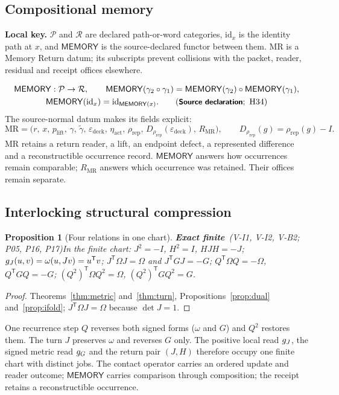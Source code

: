 \documentclass[11pt,a4paper]{article}
\newcommand{\tp}{^{\mathsf T}}
\newcommand{\MEM}{\mathsf{MEMORY}}
\newcommand{\id}{\mathrm{id}}
\newcommand{\st}[1]{\textsf{\small\textbf{#1}}}
\newcommand{\Sfin}{\st{Exact finite}}\newcommand{\Sder}{\st{Exact derived}}
\newcommand{\Ssrc}{\st{Source declaration}}\newcommand{\Sint}{\st{Interface}}
\newcommand{\lkey}[1]{\par\noindent\textbf{Local key.} #1\par\smallskip}
\theoremstyle{plain}
\newtheorem{prop}[thm]{Proposition}
\theoremstyle{definition}
\theoremstyle{remark}
\begin{document}
\subsection{Compositional memory}
\lkey{$\mathcal P$ and $\mathcal R$ are declared path-or-word categories, $\id_x$ is the identity path at $x$, and $\MEM$ is the source-declared functor between them. $\mathrm{MR}$ is a Memory Return datum; its subscripts prevent collisions with the packet, reader, residual and receipt offices elsewhere.}
\[
\begin{gathered}
\MEM:\mathcal P\to\mathcal R,\qquad \MEM(\gamma_2\circ\gamma_1)=\MEM(\gamma_2)\circ\MEM(\gamma_1),\\
\MEM(\id_x)=\id_{\MEM(x)}.\qquad(\Ssrc;\ \text{H34})
\end{gathered}
\]
The source-normal datum makes its fields explicit:
\[
\mathrm{MR}=\bigl(r,\,x,\,p_{\mathrm{lift}},\,\gamma,\,\tilde\gamma,\,\varepsilon_{\mathrm{deck}},\,\eta_{\mathrm{act}},\,\rho_{\mathrm{rep}},\,D_{\rho_{\mathrm{rep}}}(\varepsilon_{\mathrm{deck}}),\,R_{\mathrm{MR}}\bigr),\qquad D_{\rho_{\mathrm{rep}}}(g)=\rho_{\mathrm{rep}}(g)-I.
\]
$\mathrm{MR}$ retains a return reader, a lift, an endpoint defect, a represented difference and a reconstructible occurrence record. $\MEM$ answers how occurrences remain comparable; $R_{\mathrm{MR}}$ answers which occurrence was retained. Their offices remain separate.

\subsection{Interlocking structural compression}
\begin{prop}[Four relations in one chart]\Sfin\ \textit{(V-I1, V-I2, V-B2; P05, P16, P17)}\label{prop:interlock}
In the finite chart: $J^2=-I$, $H^2=I$, $HJH=-J$; $\gJ(u,v)=\omega(u,Jv)=u\tp v$; $J\tp\Omega J=\Omega$ and $J\tp GJ=-G$; $Q\tp\Omega Q=-\Omega$, $Q\tp GQ=-G$; $(Q^2)\tp\Omega Q^2=\Omega$, $(Q^2)\tp GQ^2=G$.
\end{prop}
\begin{proof}
Theorems~\ref{thm:metric} and~\ref{thm:turn}, Propositions~\ref{prop:dual} and~\ref{prop:ifold}; $J\tp\Omega J=\Omega$ because $\det J=1$.
\end{proof}
One recurrence step $Q$ reverses both signed forms ($\omega$ and $G$) and $Q^2$ restores them. The turn $J$ preserves $\omega$ and reverses $G$ only. The positive local read $g_J$, the signed metric read $g_G$ and the return pair $(J,H)$ therefore occupy one finite chart with distinct jobs. The contact operator carries an ordered update and reader outcome; $\MEM$ carries comparison through composition; the receipt retains a reconstructible occurrence.
\end{document}
